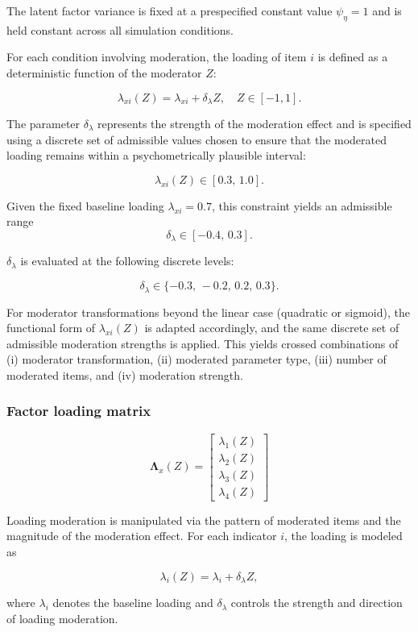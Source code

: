 \documentclass[
  man,
  floatsintext]{apa7}
\begin{document}
The latent factor variance is fixed at a prespecified constant value
\(\psi_{\eta}= 1\) and is held constant across all simulation
conditions.

For each condition involving moderation, the loading of item \(i\) is
defined as a deterministic function of the moderator \(Z\):

\[
\lambda_{xi}(Z) = \lambda_{xi} + \delta_{\lambda} Z,
\quad Z \in [-1, 1].
\]

The parameter \(\delta_{\lambda}\) represents the strength of the
moderation effect and is specified using a discrete set of admissible
values chosen to ensure that the moderated loading remains within a
psychometrically plausible interval:

\[
\lambda_{xi}(Z) \in [0.3,\, 1.0].
\]

Given the fixed baseline loading \(\lambda_{xi}=0.7\), this constraint
yields an admissible range \[
\delta_{\lambda} \in [-0.4,\, 0.3].
\]

\(\delta_{\lambda}\) is evaluated at the following discrete levels:

\[
\delta_{\lambda} \in \{-0.3,\,-0.2,\,0.2,\,0.3\}.
\]

For moderator transformations beyond the linear case (quadratic or
sigmoid), the functional form of \(\lambda_{xi}(Z)\) is adapted
accordingly, and the same discrete set of admissible moderation
strengths is applied. This yields crossed combinations of (i) moderator
transformation, (ii) moderated parameter type, (iii) number of moderated
items, and (iv) moderation strength.

\subsubsection{Factor loading matrix}\label{factor-loading-matrix}

\[
\boldsymbol{\Lambda}_x(Z) =
\begin{bmatrix}
\lambda_1(Z) \\
\lambda_2(Z) \\
\lambda_3(Z)\\
\lambda_4(Z)
\end{bmatrix}
\]

Loading moderation is manipulated via the pattern of moderated items and
the magnitude of the moderation effect. For each indicator \(i\), the
loading is modeled as

\[
\lambda_i(Z) = \lambda_i + \delta_{\lambda} Z,
\]

where \(\lambda_i\) denotes the baseline loading and
\(\delta_{\lambda}\) controls the strength and direction of loading
moderation.
\end{document}

